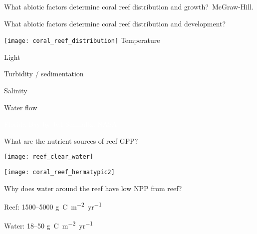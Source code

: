 \documentclass[t]{beamer}
\begin{document}
{
\begin{frame}[b]{What abiotic factors determine coral reef distribution and growth?}
\tiny\textcopyright\,McGraw-Hill.
\end{frame}
}

\begin{frame}[t]{What abiotic factors determine coral reef distribution and development?}
	\begin{multicols}{2}
		\texttt{[image: coral\_reef\_distribution]}
	\columnbreak
		\hangpara Temperature \pause
		
		\hangpara Light \pause
		
		\hangpara Turbidity / sedimentation \pause
		
		\hangpara Salinity \pause
		
		\hangpara Water flow
	\end{multicols}
\end{frame}


{
\begin{frame}[b]

\tiny\textcolor{white}{Florida Bay by Jeff Schmaltz, NASA.}
\end{frame}
}


\begin{frame}[t]{What are the nutrient sources of reef GPP?}
	\begin{multicols}{2}
		\begin{center}
		\texttt{[image: reef\_clear\_water]}
		
		\vspace*{1ex}
		
		\texttt{[image: coral\_reef\_hermatypic2]}
		\end{center}
		
	\columnbreak
	
		\hangpara\parbox[t]{1.5in}{\raggedright Why does water around the reef have low NPP from reef?}
		
		\hangpara Reef: 1500–5000 \si{\gram~C.m^{-2}.yr^{-1}}
		
		\hangpara Water: 18–50 \si{\gram~C.m^{-2}.yr^{-1}}

	\end{multicols}
\end{frame}
\end{document}
